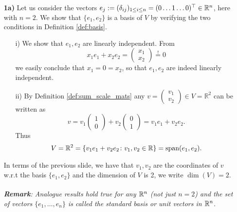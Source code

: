 \begin{frame}
{\begin{example}
\begin{itemize}
	\item[\textbf{1a)}] Let us consider the vectors $e_j := (\delta_{ij})_{1\leq i \leq n} = (0\ldots 1 \ldots 0)^\top \in {\mathbb{R}}^{n}$, here with $n=2$. We show that $\{e_1,e_2\}$ is a basis of $V$ by verifying the two conditions in Definition \ref{def:basis}.
	\begin{itemize}
		\item[i)] We show that $e_1,e_2$ are linearly independent. From
		$$x_1e_1+x_2e_2=\begin{pmatrix}x_1\\x_2\end{pmatrix}\stackrel{!}{=}0$$	
		we easily conclude that $x_1=0=x_2$, so that $e_1,e_2$ are indeed linearly independent.
		\item[ii)] By Definition \ref{def:sum_scale_mats} any $v=\begin{pmatrix}v_1\\v_2\end{pmatrix}\in V=\mathbb{R}^2$ can be written as
		$$v=v_1\begin{pmatrix}1\\0\end{pmatrix}+v_2\begin{pmatrix}0\\1\end{pmatrix} = v_1e_1+v_2e_2.$$
		Thus 
		$$V = {\mathbb{R}}^2 = \{v_1e_1+v_2e_2 \colon v_1,v_2 \in {\mathbb{R}} \} =\text{span}(e_1,e_2).$$
	\end{itemize}
In terms of the previous slide, we have that	$v_1,v_2$ are the coordinates of $v$ w.r.t the basis $\{e_1,e_2\}$ and the dimension of $V$ is 2, we write $\dim(V)=2$.\\~\\
	\textit{\textbf{Remark}: Analogue results hold true for any ${\mathbb{R}}^n$ (not just $n=2$) and the set of vectors $\{e_1,\ldots,e_n\}$ is called the {\color{defgruen}standard basis} or {\color{defgruen}unit vectors in ${\mathbb{R}}^{n}$}.}
\end{itemize}
\end{example}
}
\end{frame}

